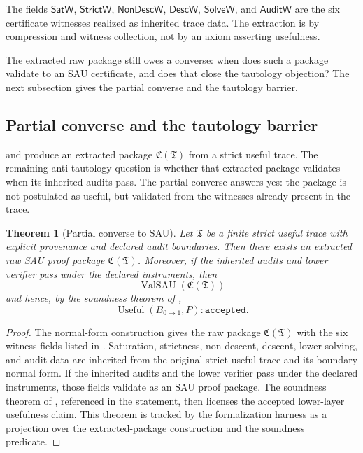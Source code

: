 \documentclass[11pt]{article}
\newcommand{\Use}{\operatorname{Useful}}
\newcommand{\ValSAU}{\operatorname{ValSAU}}
\newtheorem{theorem}{Theorem}[section]
\theoremstyle{definition}
\begin{document}
The fields \(\mathsf{SatW}\), \(\mathsf{StrictW}\), \(\mathsf{NonDescW}\),
\(\mathsf{DescW}\), \(\mathsf{SolveW}\), and \(\mathsf{AuditW}\) are the six
certificate witnesses realized as inherited trace data.  The extraction is by
compression and witness collection, not by an axiom asserting usefulness.

The extracted raw package still owes a converse: when does such a package
validate to an SAU certificate, and does that close the tautology objection?
The next subsection gives the partial converse and the tautology barrier.

\subsection{Partial converse and the tautology barrier}
\label{subsec:necessity-partial-converse-tautology-barrier}

 and
 produce an extracted package
\(\mathfrak C(\mathfrak T)\) from a strict useful trace.  The remaining
anti-tautology question is whether that extracted package validates when its
inherited audits pass.  The partial converse answers yes: the package is not
postulated as useful, but validated from the witnesses already present in the
trace.

\begin{theorem}[Partial converse to SAU]
\label{thm:sau-partial-converse}
Let \(\mathfrak T\) be a finite strict useful trace with explicit provenance and declared audit boundaries.  Then there exists an extracted raw SAU proof package \(\mathfrak C(\mathfrak T)\).  Moreover, if the inherited audits and lower verifier pass under the declared instruments, then
\[
\ValSAU(\mathfrak C(\mathfrak T))
\]
and hence, by the soundness theorem of ,
\[
\Use(B_{0\to1},P):\texttt{accepted}.
\]
\end{theorem}

\begin{proof}
The normal-form construction gives the raw package
\(\mathfrak C(\mathfrak T)\) with the six witness fields listed in
.  Saturation, strictness, non-descent,
descent, lower solving, and audit data are inherited from the original strict
useful trace and its boundary normal form.  If the inherited audits and the
lower verifier pass under the declared instruments, those fields validate as an
SAU proof package.  The soundness theorem of
, referenced in the statement, then licenses the
accepted lower-layer usefulness claim.  This theorem is tracked by the
formalization harness as a projection over the extracted-package construction
and the soundness predicate.
\end{proof}
\end{document}
